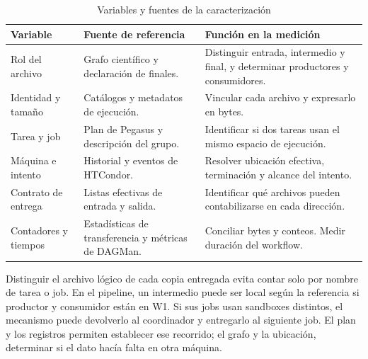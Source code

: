 \begin{table}[htbp]\centering\small
\caption{Variables y fuentes de la caracterización}
\begin{tabularx}{\linewidth}{@{}P{2.75cm}YY@{}}
\toprule Variable & Fuente de referencia & Función en la medición\\\midrule
Rol del archivo & Grafo científico y declaración de finales. & Distinguir entrada, intermedio y final, y determinar productores y consumidores.\\
Identidad y tamaño & Catálogos y metadatos de ejecución. & Vincular cada archivo y expresarlo en bytes.\\
Tarea y job & Plan de Pegasus y descripción del grupo. & Identificar si dos tareas usan el mismo espacio de ejecución.\\
Máquina e intento & Historial y eventos de HTCondor. & Resolver ubicación efectiva, terminación y alcance del intento.\\
Contrato de entrega & Listas efectivas de entrada y salida. & Identificar qué archivos pueden contabilizarse en cada dirección.\\
Contadores y tiempos & Estadísticas de transferencia y métricas de DAGMan. & Conciliar bytes y conteos. Medir duración del workflow.\\
\bottomrule
\end{tabularx}
\end{table}

Distinguir el archivo lógico de cada copia entregada evita contar solo por nombre de tarea o job. En el pipeline, un intermedio puede ser local según la referencia si productor y consumidor están en W1. Si sus jobs usan sandboxes distintos, el mecanismo puede devolverlo al coordinador y entregarlo al siguiente job. El plan y los registros permiten establecer ese recorrido; el grafo y la ubicación, determinar si el dato hacía falta en otra máquina.
